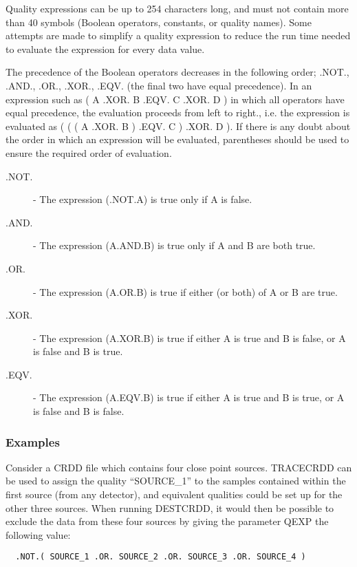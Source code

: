 Quality expressions can be up to 254 characters long, and must
not contain more than 40 symbols (Boolean operators, constants,
or quality names). Some attempts are made to simplify a quality
expression to reduce the run time needed to evaluate the
expression for every data value.

The precedence of the Boolean  operators decreases in the following
order; .NOT., .AND., .OR., .XOR., .EQV. (the final two have equal
precedence). In an expression such as ( A .XOR. B .EQV. C .XOR. D ) in
which all operators have equal precedence, the evaluation proceeds from
left to right., i.e. the expression is evaluated as ( ( ( A .XOR. B )
.EQV. C ) .XOR. D ). If there is any doubt about the order in which an
expression will be evaluated, parentheses should be used to ensure the
required order of evaluation.

\begin{description}
\item [.NOT.] -
The expression (.NOT.A) is true only if A is false.

\item [.AND.] -
The expression (A.AND.B) is true only if A and B are both true.

\item [.OR.] -
The expression (A.OR.B) is true if either (or both) of A or B are
true.

\item [.XOR.] -
The expression (A.XOR.B) is true if either A is true and B is
false, or A is false and B is true.

\item [.EQV.] -
The expression (A.EQV.B) is true if either A is true and B is
true, or A is false and B is false.
\end{description}

\subsubsection{Examples}
Consider a {\small CRDD} file which contains four close point sources.
{\small TRACECRDD} can be  used to assign the quality ``SOURCE\_1'' to
the samples contained within the  first source (from any
detector), and equivalent qualities could be set up for the other three
sources. When running {\small DESTCRDD}, it would then be possible to
exclude the data from these four sources by giving the parameter
{\small QEXP} the following value:

\small
\begin{verbatim}
  .NOT.( SOURCE_1 .OR. SOURCE_2 .OR. SOURCE_3 .OR. SOURCE_4 )
\end{verbatim}
\normalsize

